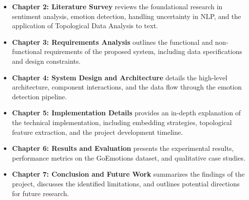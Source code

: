 \begin{itemize}
    \item \textbf{Chapter 2: Literature Survey} reviews the foundational research in sentiment analysis, emotion detection, handling uncertainty in NLP, and the application of Topological Data Analysis to text.
    \item \textbf{Chapter 3: Requirements Analysis} outlines the functional and non-functional requirements of the proposed system, including data specifications and design constraints.
    \item \textbf{Chapter 4: System Design and Architecture} details the high-level architecture, component interactions, and the data flow through the emotion detection pipeline.
    \item \textbf{Chapter 5: Implementation Details} provides an in-depth explanation of the technical implementation, including embedding strategies, topological feature extraction, and the project development timeline.
    \item \textbf{Chapter 6: Results and Evaluation} presents the experimental results, performance metrics on the GoEmotions dataset, and qualitative case studies.
    \item \textbf{Chapter 7: Conclusion and Future Work} summarizes the findings of the project, discusses the identified limitations, and outlines potential directions for future research.
\end{itemize}
